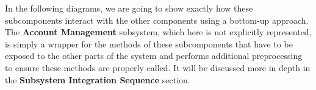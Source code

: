 In the following diagrams, we are going to show exactly how these subcomponents interact with the other components using a bottom-up approach. The \textbf{Account Management} subsystem, which here is not explicitly represented, is simply a wrapper for the methods of these subcomponents that have to be exposed to the other parts of the system and performs additional preprocessing to ensure these methods are properly called. It will be discussed more in depth in the \textbf{Subsystem Integration Sequence} section.
\begin{figure}[H]
\centering
{}
\end{figure}
\begin{figure}[H]
\centering
{}
\end{figure}
\begin{figure}[H]
\centering
{}
\end{figure}
\begin{figure}[H]
\centering
{}
\end{figure}
\pagebreak
